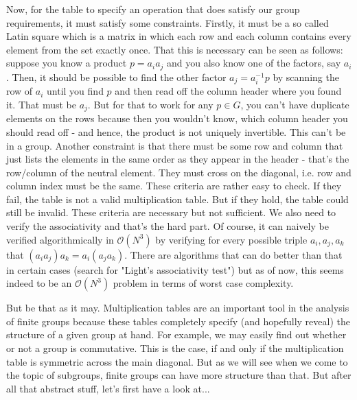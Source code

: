 \medskip
Now, for the table to specify an operation that does satisfy our group requirements, it must satisfy some constraints. Firstly, it must be a so called Latin square which is a matrix in which each row and each column contains every element from the set exactly once. That this is necessary can be seen as follows: suppose you know a product $p = a_i a_j$ and you also know one of the factors, say $a_i$. Then, it should be possible to find the other factor $a_j = a_i^{-1} p$ by scanning the row of $a_i$ until you find $p$ and then read off the column header where you found it. That must be $a_j$. But for that to work for any $p \in G$, you can't have duplicate elements on the rows because then you wouldn't know, which column header you should read off - and hence, the product is not uniquely invertible. This can't be in a group. Another constraint is that there must be some row and column that just lists the elements in the same order as they appear in the header - that's the row/column of the neutral element. They must cross on the diagonal, i.e. row and column index must be the same. These criteria are rather easy to check. If they fail, the table is not a valid multiplication table. But if they hold, the table could still be invalid. These criteria are necessary but not sufficient. We also need to verify the associativity and that's the hard part. Of course, it can naively be verified algorithmically in $\mathcal{O}(N^3)$ by verifying for every possible triple $a_i, a_j, a_k$ that $(a_i a_j) a_k = a_i (a_j a_k)$. There are algorithms that can do better than that in certain cases (search for "Light's associativity test") but as of now, this seems indeed to be an $\mathcal{O}(N^3)$ problem in terms of worst case complexity.

\medskip
But be that as it may. Multiplication tables are an important tool in the analysis of finite groups because these tables completely specify (and hopefully reveal) the structure of a given group at hand. For example, we may easily find out whether or not a group is commutative. This is the case, if and only if the multiplication table is symmetric across the main diagonal. But as we will see when we come to the topic of subgroups, finite groups can have more structure than that. But after all that abstract stuff, let's first have a look at...



